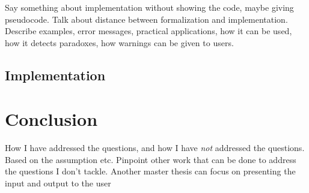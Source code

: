 \documentclass[a4paper,english]{ifimaster}
\begin{document}
Say something about implementation without showing the code, maybe giving pseudocode. Talk about distance between formalization and implementation. Describe examples, error messages, practical applications, how it can be used, how it detects paradoxes, how warnings can be given to users.

\chapter{Implementation}  

\part{Conclusion}
How I have addressed the questions, and how I have \emph{not} addressed the questions. Based on the assumption etc. Pinpoint other work that can be done to address the questions I don't tackle.
Another master thesis can focus on presenting the input and output to the user

\backmatter{}

\printbibliography
\end{document}
